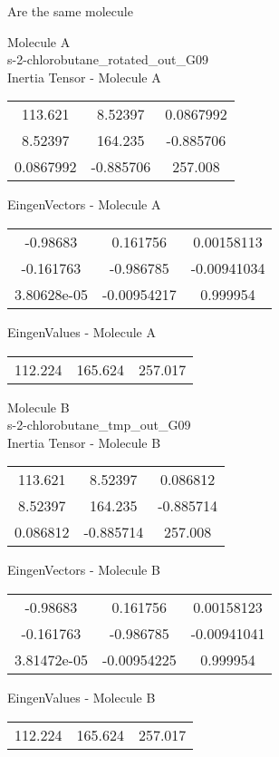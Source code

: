 \begin{center}
\vtab
\vtab
\textcolor{NavyBlue}{\Large Are the same molecule}
\end{center}
\newpage
\begin{multicols}{2}
\begin{center}
Molecule A \\ 
s-2-chlorobutane\_rotated\_out\_G09
\\
Inertia Tensor - Molecule A \\
\vtab
\begin{tabular}{|c c c|}
113.621	 & 	8.52397	 & 	0.0867992	 \\
8.52397	 & 	164.235	 & 	-0.885706	 \\
0.0867992	 & 	-0.885706	 & 	257.008
\end{tabular}

\vtab
 EingenVectors - Molecule A     \\
\vtab
\begin{tabular}{|c c c|}
-0.98683	 & 	0.161756	 & 	0.00158113	 \\
-0.161763	 & 	-0.986785	 & 	-0.00941034	 \\
3.80628e-05	 & 	-0.00954217	 & 	0.999954
\end{tabular}

\vtab
 EingenValues - Molecule A     \\
\vtab
\begin{tabular}{|c c c|}
112.224	 & 	165.624	 & 	257.017
\end{tabular}
\columnbreak

Molecule B \\ 
s-2-chlorobutane\_tmp\_out\_G09
\\
Inertia Tensor - Molecule B \\
\vtab
\begin{tabular}{|c c c|}
113.621	 & 	8.52397	 & 	0.086812	 \\
8.52397	 & 	164.235	 & 	-0.885714	 \\
0.086812	 & 	-0.885714	 & 	257.008
\end{tabular}

\vtab
 EingenVectors - Molecule B     \\
\vtab
\begin{tabular}{|c c c|}
-0.98683	 & 	0.161756	 & 	0.00158123	 \\
-0.161763	 & 	-0.986785	 & 	-0.00941041	 \\
3.81472e-05	 & 	-0.00954225	 & 	0.999954
\end{tabular}

\vtab
 EingenValues - Molecule B     \\
\vtab
\begin{tabular}{|c c c|}
112.224	 & 	165.624	 & 	257.017
\end{tabular}

\end{center}
\end{multicols}
